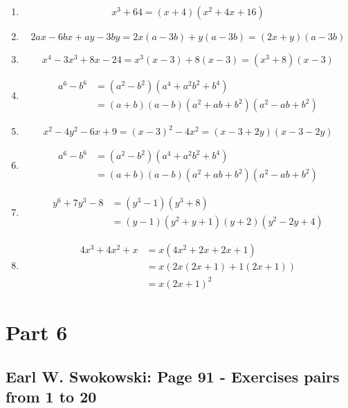 \documentclass{article}
\begin{document}
\begin{enumerate}
	\item
	      \[ x^3 + 64=(x + 4)(x^2 + 4x + 16) \]
	\item
	      \[ 2ax - 6bx + ay - 3by=2x(a - 3b) + y(a - 3b)=(2x + y)(a - 3b) \]
	\item
	      \[ x^4 - 3x^3 + 8x - 24=x^3(x - 3) + 8(x - 3)=(x^3 + 8)(x - 3) \]
	\item
	      \begin{align}
		      a^6 - b^6 & = (a^2 - b^2)(a^4  +  a^2 b^2  +  b^4)                   \\
		                & = (a  +  b)(a - b)(a^2  +  ab  +  b^2)(a^2 − ab  +  b^2)
	      \end{align}
	\item
	      \[ x^2 - 4y^2 - 6x + 9 = (x - 3)^2 - 4x^2 = (x−3 + 2y)(x−3−2y) \]
	\item
	      \begin{align}
		      a^6 - b^6 & = (a^2 - b^2)(a^4 + a^2b^2 + b^4)              \\
		                & = (a + b)(a - b)(a^2 + ab + b^2)(a^2−ab + b^2)
	      \end{align}
	\item
	      \begin{align}
		      y^6 + 7y^3 - 8 & = (y^3 - 1)(y^3 + 8)                   \\
		                     & =(y−1)(y^2 + y + 1)(y + 2)(y^2−2y + 4)
	      \end{align}
	\item
	      \begin{align}
		      4x^3 + 4x^2 + x & = x(4x^2 + 2x + 2x + 1)     \\
		                      & = x(2x(2x + 1) + 1(2x + 1)) \\
		                      & = x(2x + 1)^2
	      \end{align}
\end{enumerate}

\section{Part 6}
\subsection{Earl W. Swokowski: Page 91 - Exercises pairs from 1 to 20}
\end{document}
